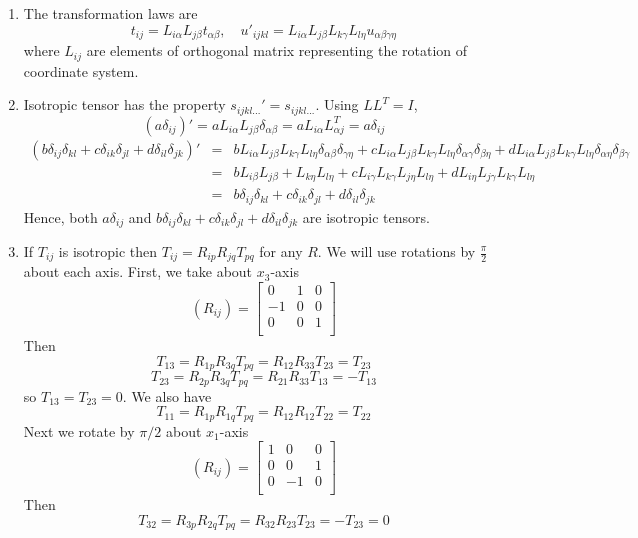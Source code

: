 \documentclass[a4paper]{article}
\begin{document}
\begin{ans}\leavevmode
\begin{enumerate}[label=(\roman*)]
\item The transformation laws are
$$t_{ij}=L_{i\alpha}L_{j\beta}t_{\alpha\beta}, \quad u'_{ijkl}=L_{i\alpha}L_{j\beta}L_{k\gamma}L_{l\eta}u_{\alpha\beta\gamma\eta}$$ where $L_{ij}$ are elements of orthogonal matrix representing the rotation of coordinate system.
\item Isotropic tensor has the property $s_{ijkl...}'=s_{ijkl...}$. Using $LL^T=I$,
$$(a\delta_{ij})'=aL_{i\alpha}L_{j\beta}\delta_{\alpha\beta}=aL_{i\alpha}L^T_{\alpha j}=a\delta_{ij}$$
\begin{eqnarray}
(b\delta_{ij}\delta_{kl}+c\delta_{ik}\delta_{jl}+d\delta_{il}\delta_{jk})'&=&bL_{i\alpha}L_{j\beta}L_{k\gamma}L_{l\eta}\delta_{\alpha\beta}\delta_{\gamma\eta}+cL_{i\alpha}L_{j\beta}L_{k\gamma}L_{l\eta}\delta_{\alpha\gamma}\delta_{\beta\eta}+dL_{i\alpha}L_{j\beta}L_{k\gamma}L_{l\eta}\delta_{\alpha\eta}\delta_{\beta\gamma}\nonumber\\&=&bL_{i\beta}L_{j\beta}+L_{k\eta}L_{l\eta}+cL_{i\gamma}L_{k\gamma}L_{j\eta}L_{l\eta}+dL_{i\eta}L_{j\gamma}L_{k\gamma}L_{l\eta}\nonumber\\&=&b\delta_{ij}\delta_{kl}+c\delta_{ik}\delta_{jl}+d\delta_{il}\delta_{jk}\nonumber
\end{eqnarray}
Hence, both $a\delta_{ij}$ and $b\delta_{ij}\delta_{kl}+c\delta_{ik}\delta_{jl}+d\delta_{il}\delta_{jk}$ are isotropic tensors.
\item If $T_{ij}$ is isotropic then $T_{ij}=R_{ip}R_{jq}T_{pq}$ for any $R$. We will use rotations by $\frac{\pi}{2}$ about each axis. First, we take about $x_3$-axis
    $$(R_{ij})=\begin{bmatrix}0&1&0\\-1&0&0\\0&0&1\\\end{bmatrix}$$
    Then 
    $$T_{13}=R_{1p}R_{3q}T_{pq}=R_{12}R_{33}T_{23}=T_{23}$$
    $$T_{23}=R_{2p}R_{3q}T_{pq}=R_{21}R_{33}T_{13}=-T_{13}$$
    so $T_{13}=T_{23}=0$. We also have
    $$T_{11}=R_{1p}R_{1q}T_{pq}=R_{12}R_{12}T_{22}=T_{22}$$
    Next we rotate by $\pi/2$ about $x_1$-axis
    $$(R_{ij})=\begin{bmatrix}1&0&0\\0&0&1\\0&-1&0\\\end{bmatrix}$$
    Then
    $$T_{32}=R_{3p}R_{2q}T_{pq}=R_{32}R_{23}T_{23}=-T_{23}=0$$

\end{enumerate}
\end{ans}
\end{document}
